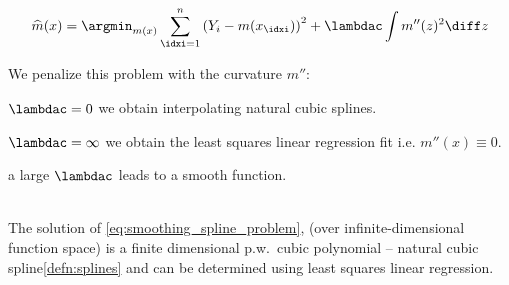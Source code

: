 \begin{defnbox}\nospacing
    \begin{defn}\label{defn:smoothing_splines_problem}
        \begin{align}
          \widehat{m}(x)=\argmin_{m(x)}\sum_{\idxi=1}^{n}\left(Y_{i}-m(x_{\idxi})\right)^{2}+\lambdac\int m''(z)^{2}\diff z\label{eq:smoothing_spline_problem}
        \end{align}
    \end{defn}
\end{defnbox}
\begin{notebox}[Note]\nospacing
    We penalize this problem with the curvature $m''$:
    \begin{itemizenosep}
        \item $\lambdac=0$ we obtain interpolating natural cubic splines.
        \item $\lambdac=\infty$ we obtain the least squares linear regression fit i.e. $m''(x)\equiv0$.
    \end{itemizenosep}
    a large $\lambdac$ leads to a smooth function.
\end{notebox}
\begin{theorembox}\nospacing
    \begin{theorem}\leavevmode\\
        The solution of \cref{eq:smoothing_spline_problem}, (over infinite-dimensional function space) is a finite dimensional
        p.w.\ cubic polynomial -- natural cubic spline\cref{defn:splines} and can be determined using least squares linear regression.
    \end{theorem}
\end{theorembox}
